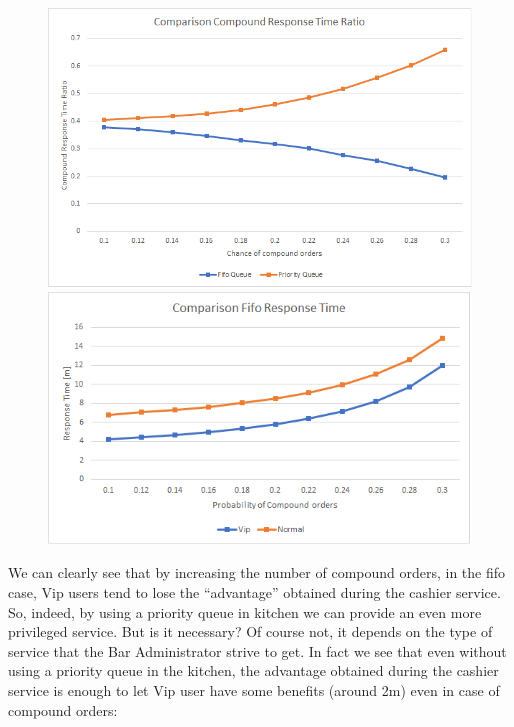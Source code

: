 \begin{figure}[h!]
    \centering
    \begin{minipage}{0.48\textwidth}
      \includegraphics[width=\textwidth]{figs/comparisonQueue.png}
      \caption{} %
      \label{}
    \end{minipage}\hspace{0.03\textwidth}
    \begin{minipage}{0.48\textwidth}
      \includegraphics[width=\textwidth]{figs/comparisonFifoKitchen.png}
      \caption{} %
      \label{}
    \end{minipage}
\end{figure}

We can clearly see that by increasing the number of compound orders, in the fifo case, Vip users tend to lose the ``advantage'' obtained during the cashier service. So, indeed, by using a priority queue in kitchen we can provide an even more privileged service. But is it necessary? Of course not, it depends on the type of service that the Bar Administrator strive to get. In fact we see that even without using a priority queue in the kitchen, the advantage obtained during the cashier service is enough to let Vip user have some benefits (around 2m) even in case of compound orders:

